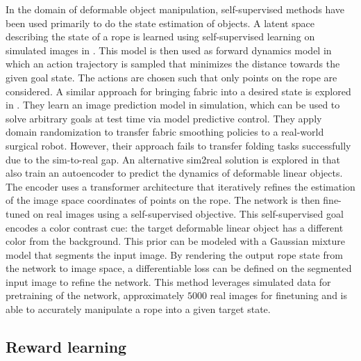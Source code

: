 \documentclass[\home/main.tex]{subfiles}
\begin{document}
In the domain of deformable object manipulation, self-supervised methods have been used primarily to do the state estimation of objects. A latent space describing the state of a rope is learned using self-supervised learning on simulated images in \autocite{yan2020learning}. This model is then used as forward dynamics model in which an action trajectory is sampled that minimizes the distance towards the given goal state. The actions are chosen such that only points on the rope are considered. A similar approach for bringing fabric into a desired state is explored in \autocite{fabric_vsf_2020}. They learn an image prediction model in simulation, which can be used to solve arbitrary goals at test time via model predictive control. They apply domain randomization to transfer fabric smoothing policies to a real-world surgical robot. However, their approach fails to transfer folding tasks successfully due to the sim-to-real gap. An alternative sim2real solution is explored in \autocite{Mengyuan2020} that also train an autoencoder to predict the dynamics of deformable linear objects. The encoder uses a transformer architecture \autocite{vaswani2017attention} that iteratively refines the estimation of the image space coordinates of points on the rope. The network is then fine-tuned on real images using a self-supervised objective. This self-supervised goal encodes a color contrast cue: the target deformable linear object has a different color from the background. This prior can be modeled with a Gaussian mixture model that segments the input image. By rendering the output rope state from the network to image space, a differentiable loss can be defined on the segmented input image to refine the network. This method leverages simulated data for pretraining of the network, approximately $5000$ real images for finetuning and is able to accurately manipulate a rope into a given target state.

\subsection{Reward learning}  \label{subsec:lit_reward_learning}
\end{document}
